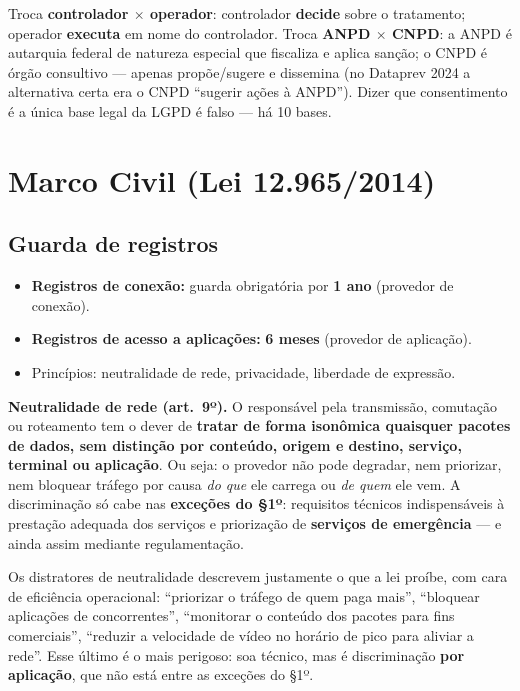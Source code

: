 \begin{pegadinha}
Troca \textbf{controlador $\times$ operador}: controlador \textbf{decide}
sobre o tratamento; operador \textbf{executa} em nome do controlador. Troca
\textbf{ANPD $\times$ CNPD}: a ANPD é autarquia federal de natureza especial
que fiscaliza e aplica sanção; o CNPD é órgão consultivo --- apenas
propõe/sugere e dissemina (no Dataprev 2024 a alternativa certa era o CNPD
``sugerir ações à ANPD''). Dizer que consentimento é a única base legal da
LGPD é falso --- há 10 bases.
\end{pegadinha}

\section{Marco Civil (Lei 12.965/2014)}
\label{sec:marco-civil}

\subsection{Guarda de registros}

\begin{itemize}
\item \textbf{Registros de conexão:} guarda obrigatória por \textbf{1 ano}
(provedor de conexão).
\item \textbf{Registros de acesso a aplicações:} \textbf{6 meses} (provedor
de aplicação).
\item Princípios: neutralidade de rede, privacidade, liberdade de
expressão.
\end{itemize}

\textbf{Neutralidade de rede (art.\ 9º).} O responsável pela transmissão,
comutação ou roteamento tem o dever de \textbf{tratar de forma isonômica
quaisquer pacotes de dados, sem distinção por conteúdo, origem e destino,
serviço, terminal ou aplicação}. Ou seja: o provedor não pode degradar, nem
priorizar, nem bloquear tráfego por causa \emph{do que} ele carrega ou
\emph{de quem} ele vem. A discriminação só cabe nas \textbf{exceções do
§1º}: requisitos técnicos indispensáveis à prestação adequada dos serviços e
priorização de \textbf{serviços de emergência} --- e ainda assim mediante
regulamentação.

\begin{pegadinha}
Os distratores de neutralidade descrevem justamente o que a lei proíbe, com
cara de eficiência operacional: ``priorizar o tráfego de quem paga mais'',
``bloquear aplicações de concorrentes'', ``monitorar o conteúdo dos pacotes
para fins comerciais'', ``reduzir a velocidade de vídeo no horário de pico
para aliviar a rede''. Esse último é o mais perigoso: soa técnico, mas é
discriminação \textbf{por aplicação}, que não está entre as exceções do §1º.
\end{pegadinha}

